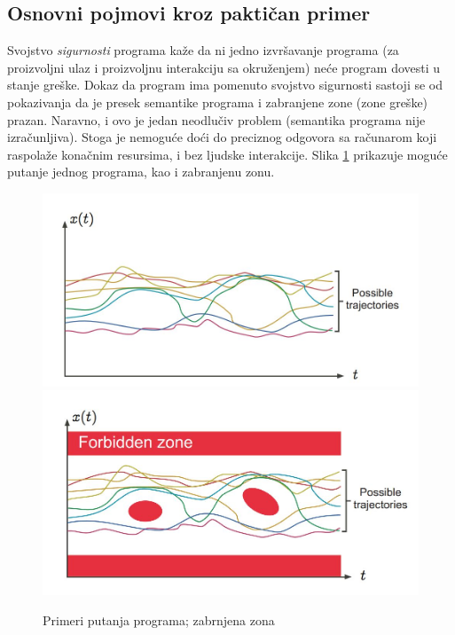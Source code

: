 \documentclass[a4paper]{article}
\begin{document}
\subsection{Osnovni pojmovi kroz paktičan primer}

Svojstvo \textit{sigurnosti} programa kaže da ni jedno izvršavanje programa (za proizvoljni ulaz i proizvoljnu interakciju sa okruženjem) neće program dovesti u stanje greške. Dokaz da program ima pomenuto svojstvo sigurnosti sastoji se od pokazivanja da je presek semantike programa i zabranjene zone (zone greške) prazan. Naravno, i ovo je jedan neodlučiv problem (semantika programa nije izračunljiva). Stoga je nemoguće doći do preciznog odgovora sa računarom koji raspolaže konačnim resursima, i bez ljudske interakcije.\cite{pcousot2} Slika \ref{fig:graf12} prikazuje moguće putanje jednog programa, kao i zabranjenu zonu.
\begin{figure}[h!]
\begin{center}
\includegraphics[scale=0.2]{graf1.JPG}
\includegraphics[scale=0.2]{graf2.JPG}
\end{center}
\caption{Primeri putanja programa; zabrnjena zona}
\label{fig:graf12}
\end{figure} \newline
\end{document}

